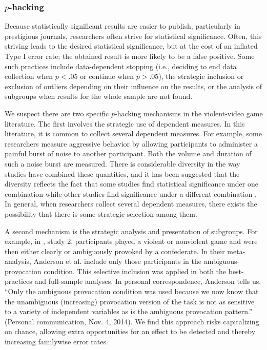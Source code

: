 \documentclass[man]{apa6}
\begin{document}
\subsubsection{$p$-hacking}
Because statistically significant results are easier to publish, particularly in prestigious journals, researchers often strive for statistical significance. Often, this striving leads to the desired statistical significance, but at the cost of an inflated Type I error rate; the obtained result is more likely to be a false positive. Some such practices include data-dependent stopping (i.e., deciding to end data collection when $p < .05$ or continue when $p > .05$), the strategic inclusion or exclusion of outliers depending on their influence on the results, or the analysis of subgroups when results for the whole sample are not found.

We suspect there are two specific $p$-hacking mechanisms in the violent-video game literature.  The first involves the strategic use of dependent measures.  In this literature, it is common to collect several dependent measures.  For example, some researchers measure aggressive behavior by allowing participants to administer a painful burst of noise to another participant. Both the volume and duration of such a noise burst are measured.  There is considerable diversity in the way studies have combined these quantities, and it has been suggested that the diversity reflects the fact that some studies find statistical significance under one combination while other studies find significance under a different combination \citep{Elson:etal:2014}.  In general, when researchers collect several dependent measures, there exists the possibility that there is some strategic selection among them.  

A second mechanism is the strategic analysis and presentation of subgroups. For example, in \citet{Anderson:etal:2004}, study 2, participants played a violent or nonviolent game and were then either clearly or ambiguously provoked by a confederate. In their meta-analysis, Anderson et al. include only those participants in the ambiguous-provocation condition. This selective inclusion was applied in both the best-practices and full-sample analyses. In personal correspondence, Anderson tells us, ``Only the ambiguous provocation condition was used because we now know that the unambiguous (increasing) provocation version of the task is not as sensitive to a variety of independent variables as is the ambiguous provocation pattern.'' (Personal communication, Nov. 4, 2014). 
We find this approach risks capitalizing on chance, allowing extra opportunities for an effect to be detected and thereby increasing familywise error rates.
\end{document}
